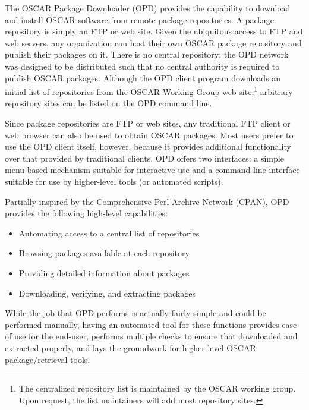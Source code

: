 %
%
%
%

The OSCAR Package Downloader (OPD) provides the capability to download
and install OSCAR software from remote package repositories.  A
package repository is simply an FTP or web site.  Given the ubiquitous
access to FTP and web servers, any organization can host their own
OSCAR package repository and publish their packages on it.  There is
no central repository; the OPD network was designed to be distributed
such that no central authority is required to publish OSCAR packages.
%
Although the OPD client program downloads an initial list of
repositories from the OSCAR Working Group web site,\footnote{The
  centralized repository list is maintained by the OSCAR working
  group.  Upon request, the list maintainers will add most repository
  sites.} arbitrary repository sites can be listed on the OPD command
line.

Since package repositories are FTP or web sites, any traditional FTP
client or web browser can also be used to obtain OSCAR packages.  Most
users prefer to use the OPD client itself, however, because it
provides additional functionality over that provided by traditional
clients.  OPD offers two interfaces: a simple menu-based mechanism
suitable for interactive use and a command-line interface suitable for
use by higher-level tools (or automated scripts).

Partially inspired by the Comprehensive Perl Archive Network (CPAN),
OPD provides the following high-level capabilities:
%
\begin{itemize}
\item Automating access to a central list of repositories
\item Browsing packages available at each repository
\item Providing detailed information about packages
\item Downloading, verifying, and extracting packages
\end{itemize}
%
While the job that OPD performs is actually fairly simple and could be
performed manually, having an automated tool for these functions
provides ease of use for the end-user, performs multiple checks to
ensure that downloaded and extracted properly, and lays the groundwork
for higher-level OSCAR package/retrieval tools.
